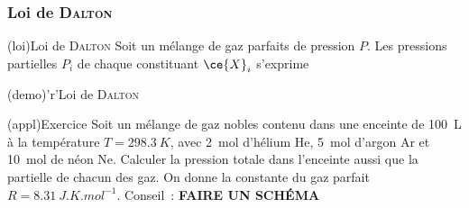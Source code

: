 \documentclass[../../main/main.tex]{subfiles}
\begin{document}
\subsubsection{Loi de \textsc{Dalton}}
\begin{tcbraster}[raster columns=2, raster equal height=rows]
	\begin{tcb}[label=loi:dalton](loi){Loi de \textsc{Dalton}}
		Soit un mélange de gaz parfaits de pression $P$. Les pressions
		partielles $P_i$ de chaque constituant $\ce{X}_i$ s'exprime
		\psw{
			\[\boxed{P_i = x_iP}\]
		}
		\vspace{-15pt}
	\end{tcb}
	\begin{tcb}[label=demo:dalton](demo)'r'{Loi de \textsc{Dalton}}
		\psw{
			\[
				P_i =\frac{n_{g,i}RT}{V} = \xunderbracket{\frac{n_{g,i}}{n_{g,\tot}}}_{x_i}
				\times \xunderbracket{\frac{n_{g,\tot}RT}{V}}_{P}
				\Lra
				\boxed{P_i = x_iP}
				\qed
			\]
		}
	\end{tcb}
\end{tcbraster}

\begin{tcb}[breakable](appl){Exercice}
	Soit un mélange de gaz nobles contenu dans une enceinte de \SI{100}{L} à la
	température $T = \SI{298.3}{K}$, avec \SI{2}{mol} d'hélium He, \SI{5}{mol}
	d'argon Ar et \SI{10}{mol} de néon Ne.
	\smallbreak
	Calculer la pression totale dans l'enceinte aussi que la partielle de chacun
	des gaz.
	\smallbreak
	On donne la constante du gaz parfait $R = \SI{8.31}{J.K.mol^{-1}}$.
	\smallbreak
	Conseil~: \textbf{FAIRE UN SCHÉMA}
	\tcblower
	\begin{isd}
		\tcblower
	\end{isd}
\end{tcb}
\end{document}
